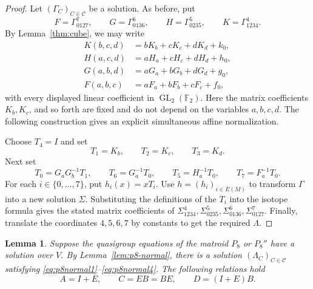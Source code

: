 \documentclass[preprint,12pt]{elsarticle}
\newtheorem{lemma}[theorem]{Lemma}
\theoremstyle{definition}
\newcommand{\F}{\mathbb F}
\newcommand{\GL}{\operatorname{GL}}
\begin{document}
\begin{proof}
Let $(\Gamma_C)_{C\in\mathcal C}$ be a solution. As before,
 put
\[
F=\Gamma_{0127}^{7},\qquad G=\Gamma_{0136}^{6},\qquad
H=\Gamma_{0235}^{5},\qquad K=\Gamma_{1234}^{4}.
\]
By
Lemma~\ref{thm:cube}, we may write
\[
\begin{aligned}
K(b,c,d)&=bK_b+cK_c+dK_d+k_0,\\
H(a,c,d)&=aH_a+cH_c+dH_d+h_0,\\
G(a,b,d)&=aG_a+bG_b+dG_d+g_0,\\
F(a,b,c)&=aF_a+bF_b+cF_c+f_0,
\end{aligned}
\]
with every displayed linear coefficient in $\GL_2(\F_2)$. Here the matrix
coefficients $K_b,K_c$, and so forth are fixed and do not depend on the
variables $a,b,c,d$. The following construction gives an explicit
simultaneous affine normalization.

Choose $T_4=I$ and set
\[
T_1=K_b,\qquad T_2=K_c,\qquad T_3=K_d.
\]
Next set
\[
T_0=G_aG_b^{-1}T_1,
\qquad
T_6=G_a^{-1}T_0,
\qquad
T_5=H_a^{-1}T_0,
\qquad
T_7=F_a^{-1}T_0.
\]
For each $i \in \{0,\dots,7\}$, put $h_i(x)=xT_i$. Use $h = (h_i)_{i \in E(M)}$ to transform $\Gamma$ into a new solution $\Sigma$. Substituting the definitions of the $T_i$ into the isotope formula gives the stated matrix coefficients of $\Sigma_{1234}^4, \Sigma_{0235}^5,\Sigma_{0136}^6,\Sigma_{0127}^7$. Finally, translate
 the coordinates $4,5,6,7$ by constants to get the required $\Lambda$.  
\end{proof}

\begin{lemma}\label{lem: matrix relation}
	Suppose the quasigroup equations of the matroid $P_8$ or $P_8''$ have a solution
	over $V$. By Lemma~\ref{lem:p8-normal}, there is a solution
	$(\Lambda_C)_{C \in \mathcal{C}}$ satisfying
	\eqref{eq:p8normal1}--\eqref{eq:p8normal4}. The following relations hold
	\begin{equation}\label{eq:blockrels}
		A=I+E,\qquad C=EB=BE,\qquad D=(I+E)B.
	\end{equation}
\end{lemma}
\end{document}
